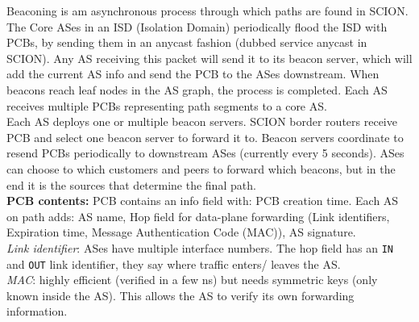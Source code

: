 \documentclass[11pt,oneside,a4paper]{article}
\begin{document}
Beaconing is am asynchronous process through which paths are found in SCION. The Core ASes in an ISD (Isolation Domain) periodically flood the ISD with PCBs, by sending them in an anycast fashion (dubbed service anycast in SCION). Any AS receiving this packet will send it to its beacon server, which will add the current AS info and send the PCB to the ASes downstream. When beacons reach leaf nodes in the AS graph, the process is completed. Each AS receives multiple PCBs representing path segments to a core AS.\\

Each AS deploys one or multiple beacon servers. SCION border routers receive PCB
and select one beacon server to forward it to. Beacon servers coordinate to resend PCBs periodically to downstream ASes (currently every 5 seconds). ASes can choose to which customers and peers to forward which beacons, but in the end it is the sources that determine the final path.\\

\textbf{PCB contents:} PCB contains an info field with: PCB creation time. Each AS on path adds: AS name, Hop field for data-plane forwarding (Link identifiers, Expiration time, Message Authentication Code (MAC)), AS signature.\\
\textit{Link identifier}: ASes have multiple interface numbers. The hop field has an \texttt{IN} and \texttt{OUT} link identifier, they say where traffic enters/ leaves the AS.\\
\textit{MAC}: highly efficient (verified in a few ns) but needs symmetric keys (only known inside the AS). This allows the AS to verify its own forwarding information.
\end{document}
